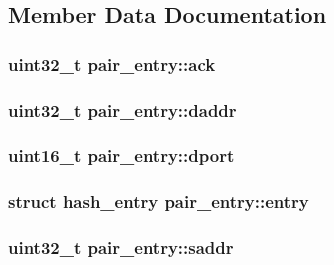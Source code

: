 \subsection{Member Data Documentation}
\hypertarget{structpair__entry_a5663beddd73df4484d031a1677a4e106}{
\subsubsection[{ack}]{\setlength{\rightskip}{0pt plus 5cm}uint32\-\_\-t pair\-\_\-entry\-::ack}}\label{structpair__entry_a5663beddd73df4484d031a1677a4e106}
\hypertarget{structpair__entry_a15520a7cf1c9584092b647f92b1866c8}{
\subsubsection[{daddr}]{\setlength{\rightskip}{0pt plus 5cm}uint32\-\_\-t pair\-\_\-entry\-::daddr}}\label{structpair__entry_a15520a7cf1c9584092b647f92b1866c8}
\hypertarget{structpair__entry_abfa3c6b00df49f7f2ba40457b0692043}{
\subsubsection[{dport}]{\setlength{\rightskip}{0pt plus 5cm}uint16\-\_\-t pair\-\_\-entry\-::dport}}\label{structpair__entry_abfa3c6b00df49f7f2ba40457b0692043}
\hypertarget{structpair__entry_a922a44fbd9f13e69b82957fe3d140648}{
\subsubsection[{entry}]{\setlength{\rightskip}{0pt plus 5cm}struct {\bf hash\-\_\-entry} pair\-\_\-entry\-::entry}}\label{structpair__entry_a922a44fbd9f13e69b82957fe3d140648}
\hypertarget{structpair__entry_a950b8a14bcfcdba36581823abf211815}{
\subsubsection[{saddr}]{\setlength{\rightskip}{0pt plus 5cm}uint32\-\_\-t pair\-\_\-entry\-::saddr}}\label{structpair__entry_a950b8a14bcfcdba36581823abf211815}
